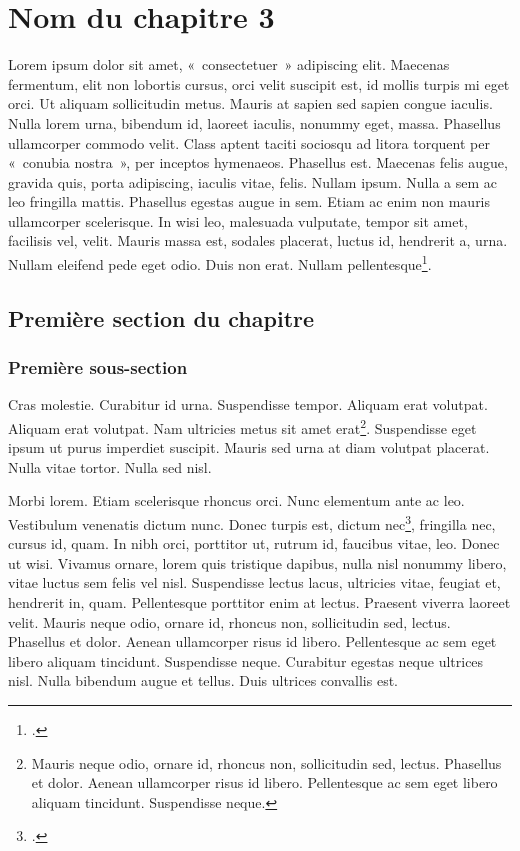 
\chapter[ceci est un long titre bis]{Nom du chapitre 3}

Lorem ipsum dolor sit amet, «~consectetuer~» adipiscing elit. Maecenas fermentum, elit non lobortis cursus, orci velit suscipit est, id mollis turpis mi eget orci. Ut aliquam sollicitudin metus. Mauris at sapien sed sapien congue iaculis. Nulla lorem urna, bibendum id, laoreet iaculis, nonummy eget, massa. Phasellus ullamcorper commodo velit. Class aptent taciti sociosqu ad litora torquent per «~conubia nostra~», per inceptos hymenaeos. Phasellus est. Maecenas felis augue, gravida quis, porta adipiscing, iaculis vitae, felis. Nullam ipsum. Nulla a sem ac leo fringilla mattis. Phasellus egestas augue in sem. Etiam ac enim non mauris ullamcorper scelerisque. In wisi leo, malesuada vulputate, tempor sit amet, facilisis vel, velit. Mauris massa est, sodales placerat, luctus id, hendrerit a, urna. Nullam eleifend pede eget odio. Duis non erat. Nullam pellentesque\footcite[225]{Doule1887}.

\section{Première section du chapitre}

\subsection{Première sous-section}

Cras molestie. Curabitur id urna. Suspendisse tempor. Aliquam erat volutpat. Aliquam erat volutpat. Nam ultricies metus sit amet erat\footnote{Mauris neque odio, ornare id, rhoncus non, sollicitudin sed, lectus. Phasellus et dolor. Aenean ullamcorper risus id libero. Pellentesque ac sem eget libero aliquam tincidunt. Suspendisse neque.}. Suspendisse eget ipsum ut purus imperdiet suscipit. Mauris sed urna at diam volutpat placerat. Nulla vitae tortor. Nulla sed nisl.

Morbi lorem. Etiam scelerisque rhoncus orci. Nunc elementum ante ac leo. Vestibulum venenatis dictum nunc. Donec turpis est, dictum nec\footcite[228]{Drocher2006}, fringilla nec, cursus id, quam. In nibh orci, porttitor ut, rutrum id, faucibus vitae, leo. Donec ut wisi. Vivamus ornare, lorem quis tristique dapibus, nulla nisl nonummy libero, vitae luctus sem felis vel nisl. Suspendisse lectus lacus, ultricies vitae, feugiat et, hendrerit in, quam. Pellentesque porttitor enim at lectus. Praesent viverra laoreet velit. Mauris neque odio, ornare id, rhoncus non, sollicitudin sed, lectus. Phasellus et dolor. Aenean ullamcorper risus id libero. Pellentesque ac sem eget libero aliquam tincidunt. Suspendisse neque. Curabitur egestas neque ultrices nisl. Nulla bibendum augue et tellus. Duis ultrices convallis est.

